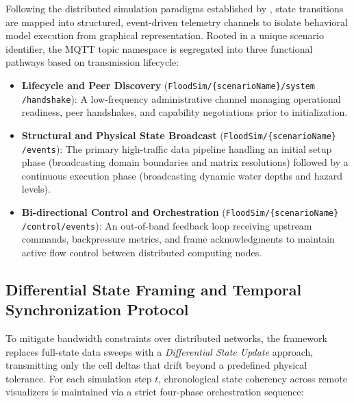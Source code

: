 Following the distributed simulation paradigms established by \cite{FonsecaICasas2013}, state transitions are mapped into structured, event-driven telemetry channels to isolate behavioral model execution from graphical representation. Rooted in a unique scenario identifier, the MQTT topic namespace is segregated into three functional pathways based on transmission lifecycle:

\begin{itemize}
    \item \textbf{Lifecycle and Peer Discovery} (\texttt{FloodSim/\{scenarioName\}/system \\ /handshake}): A low-frequency administrative channel managing operational readiness, peer handshakes, and capability negotiations prior to initialization.
    
    \item \textbf{Structural and Physical State Broadcast} (\texttt{FloodSim/\{scenarioName\} \\ /events}): The primary high-traffic data pipeline handling an initial setup phase (broadcasting domain boundaries and matrix resolutions) followed by a continuous execution phase (broadcasting dynamic water depths and hazard levels).
    
    \item \textbf{Bi-directional Control and Orchestration} (\texttt{FloodSim/\{scenarioName\} \\ /control/events}): An out-of-band feedback loop receiving upstream commands, backpressure metrics, and frame acknowledgments to maintain active flow control between distributed computing nodes.
\end{itemize}

\subsection{Differential State Framing and Temporal Synchronization Protocol}
\label{subsec:temporal_synchronization}

To mitigate bandwidth constraints over distributed networks, the framework replaces full-state data sweeps with a \textit{Differential State Update} approach, transmitting only the cell deltas that drift beyond a predefined physical tolerance. For each simulation step $t$, chronological state coherency across remote visualizers is maintained via a strict four-phase orchestration sequence:

